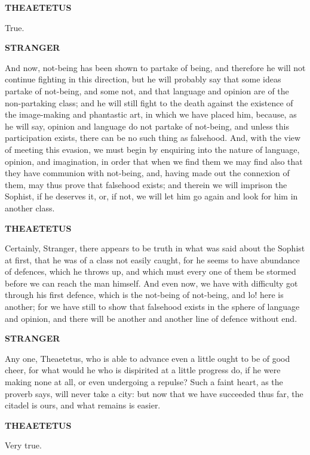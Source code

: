\documentclass[11pt,letter]{article}
\begin{document}
\par \textbf{THEAETETUS}
\par   True.

\par \textbf{STRANGER}
\par   And now, not-being has been shown to partake of being, and therefore he will not continue fighting in this direction, but he will probably say that some ideas partake of not-being, and some not, and that language and opinion are of the non-partaking class; and he will still fight to the death against the existence of the image-making and phantastic art, in which we have placed him, because, as he will say, opinion and language do not partake of not-being, and unless this participation exists, there can be no such thing as falsehood. And, with the view of meeting this evasion, we must begin by enquiring into the nature of language, opinion, and imagination, in order that when we find them we may find also that they have communion with not-being, and, having made out the connexion of them, may thus prove that falsehood exists; and therein we will imprison the Sophist, if he deserves it, or, if not, we will let him go again and look for him in another class.

\par \textbf{THEAETETUS}
\par   Certainly, Stranger, there appears to be truth in what was said about the Sophist at first, that he was of a class not easily caught, for he seems to have abundance of defences, which he throws up, and which must every one of them be stormed before we can reach the man himself. And even now, we have with difficulty got through his first defence, which is the not-being of not-being, and lo! here is another; for we have still to show that falsehood exists in the sphere of language and opinion, and there will be another and another line of defence without end.

\par \textbf{STRANGER}
\par   Any one, Theaetetus, who is able to advance even a little ought to be of good cheer, for what would he who is dispirited at a little progress do, if he were making none at all, or even undergoing a repulse? Such a faint heart, as the proverb says, will never take a city:  but now that we have succeeded thus far, the citadel is ours, and what remains is easier.

\par \textbf{THEAETETUS}
\par   Very true.
\end{document}
